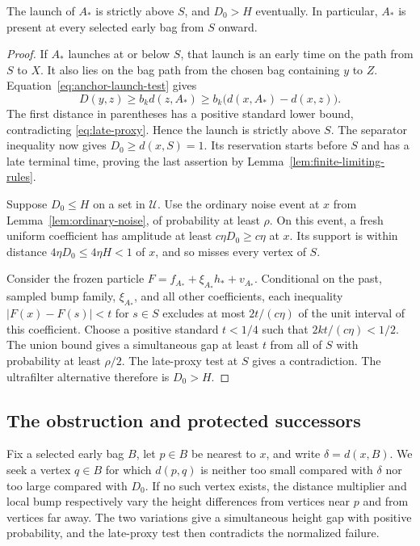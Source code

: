 \begin{lemma}
\label{lem:old-distant-anchor}
The launch of $A_*$ is strictly above $S$, and $D_0>H$ eventually.
In particular, $A_*$ is present at every selected early bag from $S$
onward.
\end{lemma}

\begin{proof}
If $A_*$ launches at or below $S$, that launch is an early time on the
path from $S$ to $X$.  It also lies on the bag path from the chosen bag
containing $y$ to $Z$.  Equation~\eqref{eq:anchor-launch-test} gives
\[
 D(y,z)\geq b_kd(z,A_*)
 \geq b_k\bigl(d(x,A_*)-d(x,z)\bigr).
\]
The first distance in parentheses has a positive standard lower bound,
contradicting \eqref{eq:late-proxy}.  Hence the launch is strictly above
$S$.  The separator inequality now gives $D_0\geq d(x,S)=1$.
Its reservation starts before $S$ and has a late terminal time, proving
the last assertion by Lemma~\ref{lem:finite-limiting-rules}.

Suppose $D_0\leq H$ on a set in $\mathcal U$.  Use the ordinary noise
event at $x$ from Lemma~\ref{lem:ordinary-noise}, of probability at least
$\rho$.  On this event, a fresh uniform coefficient has amplitude at least
$c\eta D_0\geq c\eta$ at $x$.  Its support is within distance
$4\eta D_0\leq4\eta H<1$ of $x$, and so misses every vertex of $S$.

Consider the frozen particle $F=f_{A_*}+\xi_{A_*}h_*+v_{A_*}$.
Conditional on the past, sampled bump family, $\xi_{A_*}$, and all other
coefficients, each inequality $|F(x)-F(s)|<t$ for $s\in S$ excludes at
most $2t/(c\eta)$ of the unit interval of this coefficient.  Choose a
positive standard $t<1/4$ such that $2kt/(c\eta)<1/2$.
The union bound gives a simultaneous gap at least $t$ from all of $S$
with probability at least $\rho/2$.  The late-proxy test at $S$ gives a
contradiction.  The ultrafilter alternative therefore is $D_0>H$.
\end{proof}

\subsection{The obstruction and protected successors}

Fix a selected early bag $B$, let $p\in B$ be nearest to $x$, and
write $\delta=d(x,B)$. We seek a vertex $q\in B$ for which $d(p,q)$
is neither too small compared with $\delta$ nor too large compared
with $D_0$. If no such vertex exists, the distance multiplier and local bump
respectively vary the height differences from vertices near $p$ and
from vertices far away. The two variations give a simultaneous height
gap with positive probability, and the late-proxy test then contradicts
the normalized failure.

